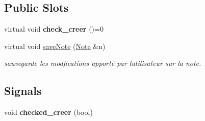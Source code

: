 \subsection*{Public Slots}
\begin{DoxyCompactItemize}
\item 
\mbox{\label{class_q_note_a2c59bd1dee880b825b692204adea842b}} 
virtual void {\bfseries check\+\_\+creer} ()=0
\item 
virtual void \hyperlink{class_q_note_a577f684ef199a17dc468d706b1383581}{save\+Note} (\hyperlink{class_note}{Note} \&n)
\begin{DoxyCompactList}\small\item\em sauvegarde les modfications apporté par l\textquotesingle{}utilisateur sur la note. \end{DoxyCompactList}\end{DoxyCompactItemize}
\subsection*{Signals}
\begin{DoxyCompactItemize}
\item 
\mbox{\label{class_q_note_ac16104445934f4b13c7f20f268a90304}} 
void {\bfseries checked\+\_\+creer} (bool)
\end{DoxyCompactItemize}
